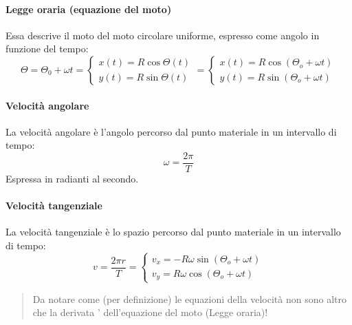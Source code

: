         \paragraph{Legge oraria (equazione del moto)} Essa descrive il moto del
        moto circolare uniforme, espresso come angolo in funzione del tempo:
        \begin{equation}
            \Theta = \Theta_0 + \omega t = 
            \begin{cases}
                x(t)=R\cos{\Theta(t)} \\
                y(t)=R\sin{\Theta(t)}
            \end{cases} 
            = 
            \begin{cases}
                x(t)=R\cos{(\Theta_o+\omega t)} \\
                y(t)=R\sin{(\Theta_o+\omega t)}
            \end{cases}
        \end{equation}

        \paragraph{Velocità angolare} La velocità angolare è l'angolo percorso
        dal punto materiale in un intervallo di tempo:
        \begin{equation}
            \omega = \frac{2\pi}{T}
        \end{equation}
        Espressa in radianti al secondo.

        \paragraph{Velocità tangenziale} La velocità tangenziale è lo spazio 
        percorso dal punto materiale in un intervallo di tempo:
        \begin{equation}
            v = \frac{2\pi r}{T} = 
            \begin{cases}
                v_x=-R\omega\sin{(\Theta_o+\omega t)} \\
                v_y=R\omega\cos{(\Theta_o+\omega t)}
            \end{cases}
        \end{equation}

        \begin{quote}
            Da notare come (per definizione) le equazioni della velocità non 
            sono altro che la derivata ' dell'equazione del moto (Legge oraria)! 
        \end{quote}

